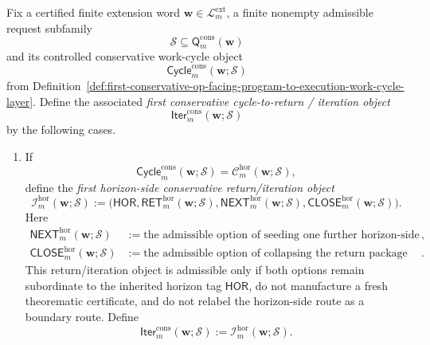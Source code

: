 \begin{definition}
\label{def:first-conservative-cycle-to-return-iteration-interface}
Fix a certified finite extension word \(\mathbf w\in\mathcal L^{\mathrm{ext}}_{m}\), a finite nonempty admissible request subfamily
\[
  \mathcal S \subseteq \mathsf{Q}^{\mathrm{cons}}_{m}(\mathbf w)
\]
and its controlled conservative work-cycle object
\[
  \mathsf{Cycle}^{\mathrm{cons}}_{m}(\mathbf w;\mathcal S)
\]
from Definition~\ref{def:first-conservative-op-facing-program-to-execution-work-cycle-layer}. Define the associated \emph{first conservative cycle-to-return / iteration object}
\[
  \mathsf{Iter}^{\mathrm{cons}}_{m}(\mathbf w;\mathcal S)
\]
by the following cases.
\begin{enumerate}[label=(\roman*)]
  \item If
  \[
    \mathsf{Cycle}^{\mathrm{cons}}_{m}(\mathbf w;\mathcal S)
    =
    \mathcal C^{\mathrm{hor}}_{m}(\mathbf w;\mathcal S),
  \]
define the \emph{first horizon-side conservative return/iteration object}
\[
  \mathcal I^{\mathrm{hor}}_{m}(\mathbf w;\mathcal S)
  :=
  \bigl(
    \mathsf{HOR},
    \mathsf{RET}^{\mathrm{hor}}_{m}(\mathbf w;\mathcal S),
    \mathsf{NEXT}^{\mathrm{hor}}_{m}(\mathbf w;\mathcal S),
    \mathsf{CLOSE}^{\mathrm{hor}}_{m}(\mathbf w;\mathcal S)
  \bigr).
\]
Here
\begin{align*}
  \mathsf{NEXT}^{\mathrm{hor}}_{m}(\mathbf w;\mathcal S)
  &:= \text{the admissible option of seeding one further horizon-side conservative cycle subordinate to the inherited horizon tag},\\
  \mathsf{CLOSE}^{\mathrm{hor}}_{m}(\mathbf w;\mathcal S)
  &:= \text{the admissible option of collapsing the return package into one compact horizon-side conservative comparison/closing object subordinate to the inherited horizon tag}.
\end{align*}
This return/iteration object is admissible only if both options remain subordinate to the inherited horizon tag \(\mathsf{HOR}\), do not manufacture a fresh theorematic certificate, and do not relabel the horizon-side route as a boundary route. Define
\[
  \mathsf{Iter}^{\mathrm{cons}}_{m}(\mathbf w;\mathcal S)
  :=
  \mathcal I^{\mathrm{hor}}_{m}(\mathbf w;\mathcal S).
\]


\end{enumerate}
\end{definition}
